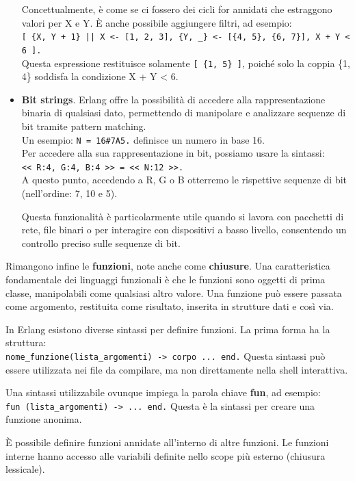 \documentclass{article}
\begin{document}
\begin{itemize}
    Concettualmente, è come se ci fossero dei cicli for annidati che estraggono valori per X e Y. È anche possibile aggiungere filtri, ad esempio:\\
    \texttt{[ \{X, Y + 1\} || X <- [1, 2, 3], \{Y, \_\} <- [\{4, 5\}, \{6, 7\}], X + Y < 6 ].}\\
    Questa espressione restituisce solamente \texttt{[ \{1, 5\} ]}, poiché solo la coppia \{1, 4\} soddisfa la condizione X + Y < 6.
    \item \textbf{Bit strings}. Erlang offre la possibilità di accedere alla rappresentazione binaria di qualsiasi dato, permettendo di manipolare e analizzare sequenze di bit tramite pattern matching.\\
    Un esempio: \texttt{N = 16\#7A5.} definisce un numero in base 16.\\
    Per accedere alla sua rappresentazione in bit, possiamo usare la sintassi:\\
    \texttt{<< R:4, G:4, B:4 >> = << N:12 >>.}\\
    A questo punto, accedendo a R, G o B otterremo le rispettive sequenze di bit (nell'ordine: 7, 10 e 5).

    Questa funzionalità è particolarmente utile quando si lavora con pacchetti di rete, file binari o per interagire con dispositivi a basso livello, consentendo un controllo preciso sulle sequenze di bit.
\end{itemize}

Rimangono infine le \textbf{funzioni}, note anche come \textbf{chiusure}. Una caratteristica fondamentale dei linguaggi funzionali è che le funzioni sono oggetti di prima classe, manipolabili come qualsiasi altro valore. Una funzione può essere passata come argomento, restituita come risultato, inserita in strutture dati e così via.

In Erlang esistono diverse sintassi per definire funzioni. La prima forma ha la struttura:\\
\texttt{nome\_funzione(lista\_argomenti) -> corpo ... end.} Questa sintassi può essere utilizzata nei file da compilare, ma non direttamente nella shell interattiva.

Una sintassi utilizzabile ovunque impiega la parola chiave \textbf{fun}, ad esempio:\\
\texttt{fun (lista\_argomenti) -> ... end.} Questa è la sintassi per creare una funzione anonima.

È possibile definire funzioni annidate all'interno di altre funzioni. Le funzioni interne hanno accesso alle variabili definite nello scope più esterno (chiusura lessicale).
\end{document}
